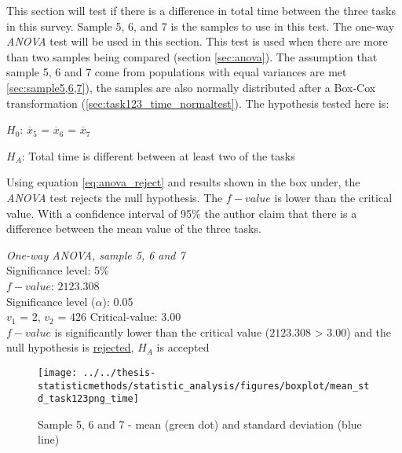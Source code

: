 This section will test if there is a difference in total time between the three tasks in this survey. Sample 5, 6, and 7 is the samples to use in this test. The one-way \textit{ANOVA} test will be used in this section. This test is used when there are more than two samples being compared (section \ref{sec:anova}). The assumption that sample 5, 6 and 7 come from populations with equal variances are met \ref{sec:sample5,6,7}), the samples are also normally distributed after a Box-Cox transformation (\ref{sec:task123_time_normaltest}). The hypothesis tested here is:\\

\centerline{$H_{0}$: $\overline{x}_5$ = $\overline{x}_6$ = $\overline{x}_7$}
\centerline{$H_{A}$: Total time is different between at least two of the tasks}

Using equation \ref{eq:anova_reject} and results shown in the box under, the \textit{ANOVA} test rejects the null hypothesis. The $f-value$ is lower than the critical value. With a confidence interval of 95\% the author claim that there is a difference between the mean value of the three tasks.

 \begin{center}
	\begin{tcolorbox}[width=0.8\textwidth]
		\centering
		\textit{One-way \textit{ANOVA}, sample 5, 6 and 7}\\
		Significance level: 5\%  \\[0.5cm]
		
		$f-value$: $2123.308$ \\
		Significance level ($\alpha$): 0.05 \\
		$v_1$ = 2, $v_2$ = 426
		Critical-value: 3.00 \\[0.2cm] %
		
		$f-value$ is significantly lower than the critical value ($2123.308$ > $3.00$) and the null hypothesis is \underline{rejected}, $H_A$ is accepted\\[0.5cm]
	\end{tcolorbox} 
\end{center}

\begin{figure}[h!]
	\centering
	\texttt{[image: ../../thesis-statisticmethods/statistic\_analysis/figures/boxplot/mean\_std\_task123png\_time]}
	\caption{Sample 5, 6 and 7 - mean (green dot) and standard deviation (blue line)}
	\label{fig:meanstdtask123pngtime}
\end{figure}

